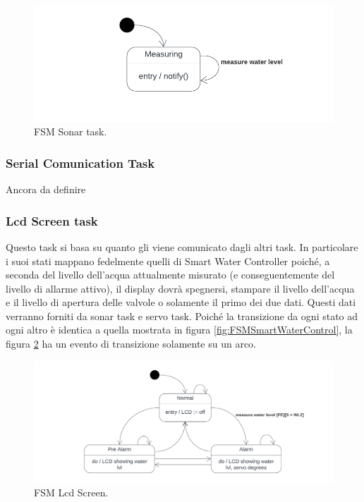 \documentclass[a4paper,12pt]{report}
\begin{document}
\begin{figure}[H]
\centering
\includegraphics[width=\textwidth]{img/State - Sonar.png}
\caption{FSM Sonar task.}
\label{fig:FSMSonar}
\end{figure}

\subsubsection{Serial Comunication Task}
Ancora da definire

\subsubsection{Lcd Screen task}
Questo task si basa su quanto gli viene comunicato dagli altri task. In particolare i suoi stati mappano fedelmente quelli di Smart Water Controller poiché, a seconda del livello dell'acqua attualmente misurato (e conseguentemente del livello di allarme attivo), il display dovrà spegnersi, stampare il livello dell'acqua e il livello di apertura delle valvole o solamente il primo dei due dati. Questi dati verranno forniti da sonar task e servo task.
Poiché la transizione da ogni stato ad ogni altro è identica a quella mostrata in figura \ref{fig:FSMSmartWaterControl}, la figura \ref{fig:FSMLCDTask} ha un evento di transizione solamente su un arco.

\begin{figure}[H]
\centering
\includegraphics[width=\textwidth]{img/State - LCDScreen.png}
\caption{FSM Lcd Screen.}
\label{fig:FSMLCDTask}
\end{figure}
\end{document}
